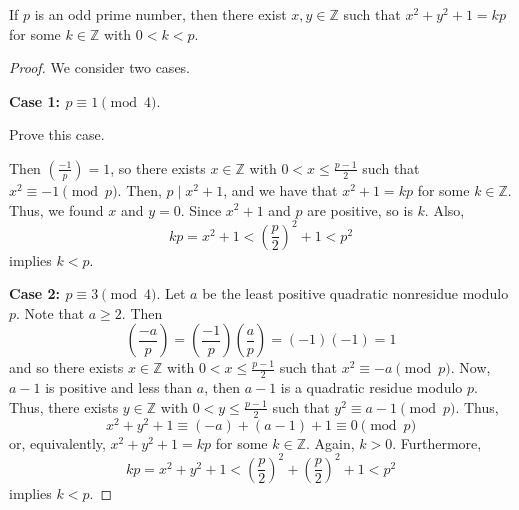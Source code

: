 \documentclass[letterpaper, 11 pt]{article}
\begin{document}
\begin{thm}
 If $p$ is an odd prime number, then there exist $x,y\in\mathbb{Z}$ such that $x^2+y^2+1=kp$ for some $k\in\mathbb{Z}$ with $0<k<p$.
\end{thm}
\begin{proof}
 We consider two cases.
 
{\bf Case 1: $p\equiv 1\pmod 4$}. 
\begin{br}[10 minutes]
 Prove this case.
\end{br}
Then $\left(\frac{-1}{p}\right)=1$, so there exists $x\in\mathbb{Z}$ with $0<x\leq\frac{p-1}{2}$ such that $x^2\equiv -1 \pmod p$. Then, $p\mid x^2+1$, and we have that $x^2+1=kp$ for some $k\in\mathbb{Z}$. Thus, we found $x$ and $y= {0}$. Since $x^2+1$ and $p$ are positive, so is $k$. Also, \[kp=x^2+1<\left(\frac{p}{2}\right)^2+1<p^2\] implies $k<p$.

{\bf Case 2: $p\equiv 3\pmod 4$}. Let $a$ be the least positive quadratic nonresidue modulo $p$. Note that $a\geq2$. Then \[\left(\frac{-a}{p}\right)=\left(\frac{-1}{p}\right)\left(\frac{a}{p}\right)=(-1)(-1)=1\] and so there exists $x\in\mathbb{Z}$ with $0<x\leq\frac{p-1}{2}$ such that $x^2\equiv -a \pmod p$. Now, $a-1$ is positive and less than $a$, then $a-1$ is a quadratic residue modulo $p$. Thus, there exists $y\in\mathbb{Z}$ with $0<y\leq\frac{p-1}{2}$ such that $y^2\equiv a-1 \pmod p$. Thus, \[x^2+y^2+1\equiv (-a)+(a-1)+1\equiv 0 \pmod p\] or, equivalently, $x^2+y^2+1=kp$ for some $k\in\mathbb{Z}$. Again, $k>0$. Furthermore, \[kp=x^2+y^2+1<\left(\frac{p}{2}\right)^2+\left(\frac{p}{2}\right)^2+1<p^2\] implies $k<p$. \qedhere
\end{proof}
\end{document}
